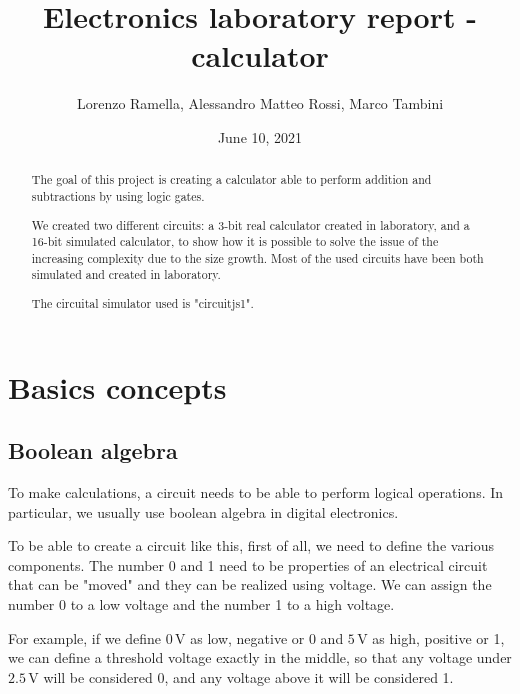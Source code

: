 \documentclass{article}
\title{Electronics laboratory report - calculator}
\author{Lorenzo Ramella, Alessandro Matteo Rossi, Marco Tambini}
\date{June 10, 2021}
\begin{document}
\maketitle

\begin{abstract}
  The goal of this project is creating a calculator able to perform addition and subtractions by using logic gates.

\vspace{3mm}

  We created two different circuits: a 3-bit real calculator created in laboratory, and a 16-bit simulated calculator, to show how it is possible to solve the issue of the increasing complexity due to the size growth. Most of the used circuits have been both simulated and created in laboratory.

\vspace{3mm}

  The circuital simulator used is "circuitjs1". %
\end{abstract}
\clearpage
\tableofcontents

\clearpage

\section{Basics concepts}

\subsection{Boolean algebra}
To make calculations, a circuit needs to be able to perform logical operations. In particular, we usually use boolean algebra in digital electronics. 

\vspace{3mm}

To be able to create a circuit like this, first of all, we need to define the various components.
The number 0 and 1 need to be properties of an electrical circuit that can be "moved" and they can be realized using voltage. We can assign the number 0 to a low voltage and the number 1 to a high voltage. 

\vspace{3mm}

For example, if we define $0\,\textrm{V}$ as low, negative or 0 and $5\,\textrm{V}$ as high, positive or 1, we can define a threshold voltage exactly in the middle, so that any voltage under $2.5\,\textrm{V}$ will be considered 0, and any voltage above it will be considered 1.
\end{document}
